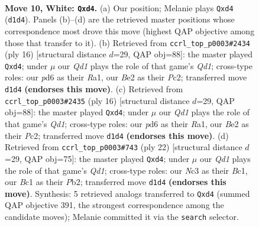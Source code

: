 \documentclass[11pt]{article}
\begin{document}
\clearpage

\begin{figure}[p]\centering
\begin{subfigure}{0.46\textwidth}\centering
\resizebox{\linewidth}{!}{%
\newchessgame
\chessboard[
  setfen={r1bq1rk1/ppp2pbp/3p1np1/8/2PnP3/2N4P/PP2BPP1/R1BQ1RK1 w - - 0 10},
  showmover=false,
  pgfstyle=straightmove, color=movearrow, markmove={d1-d4}
]}
\caption{}
\end{subfigure}\hfill
\begin{subfigure}{0.46\textwidth}\centering
\resizebox{\linewidth}{!}{%
\newchessgame
\chessboard[
  setfen={r1bq1rk1/ppp1bppp/3p1n2/8/3nPP2/2N5/PPP1B1PP/R1BQ1RK1 w - - 0 9},
  showmover=false,
  pgfstyle=straightmove, color=movearrow, markmove={d1-d4}
]}
\caption{}
\end{subfigure}
\\[4pt]
\begin{subfigure}{0.46\textwidth}\centering
\resizebox{\linewidth}{!}{%
\newchessgame
\chessboard[
  setfen={r1bq1rk1/ppp1bppp/3p1n2/8/3nPP2/2N5/PPP1B1PP/R1BQ1RK1 w - - 0 9},
  showmover=false,
  pgfstyle=straightmove, color=movearrow, markmove={d1-d4}
]}
\caption{}
\end{subfigure}\hfill
\begin{subfigure}{0.46\textwidth}\centering
\resizebox{\linewidth}{!}{%
\newchessgame
\chessboard[
  setfen={r1bq1rk1/ppp3bp/3p1pp1/8/2PnP1n1/2N5/PP2BPPP/R1BQ1RK1 w - - 0 12},
  showmover=false,
  pgfstyle=straightmove, color=movearrow, markmove={d1-d4}
]}
\caption{}
\end{subfigure}
\caption{\textbf{Move 10, White: \texttt{Qxd4}.} (a) Our position; Melanie plays \texttt{Qxd4} (\texttt{d1d4}). Panels (b)--(d) are the retrieved master positions whose correspondence most drove this move (highest QAP objective among those that transfer to it). (b) Retrieved from \texttt{ccrl\_top\_p0003\#2434} (ply 16) [structural distance $d$=29, QAP obj=88]: the master played \texttt{Qxd4}; under $\mu$ our \emph{Qd1} plays the role of that game's \emph{Qd1}; cross-type roles: our \emph{p}d6 as their \emph{R}a1, our \emph{B}e2 as their \emph{P}c2; transferred move \texttt{d1d4} \textbf{(endorses this move)}. (c) Retrieved from \texttt{ccrl\_top\_p0003\#2435} (ply 16) [structural distance $d$=29, QAP obj=88]: the master played \texttt{Qxd4}; under $\mu$ our \emph{Qd1} plays the role of that game's \emph{Qd1}; cross-type roles: our \emph{p}d6 as their \emph{R}a1, our \emph{B}e2 as their \emph{P}c2; transferred move \texttt{d1d4} \textbf{(endorses this move)}. (d) Retrieved from \texttt{ccrl\_top\_p0003\#743} (ply 22) [structural distance $d$=29, QAP obj=75]: the master played \texttt{Qxd4}; under $\mu$ our \emph{Qd1} plays the role of that game's \emph{Qd1}; cross-type roles: our \emph{N}c3 as their \emph{B}c1, our \emph{B}c1 as their \emph{P}b2; transferred move \texttt{d1d4} \textbf{(endorses this move)}. Synthesis: 5 retrieved analogs transferred to \texttt{Qxd4} (summed QAP objective 391, the strongest correspondence among the candidate moves); Melanie committed it via the \texttt{search} selector.}
\label{fig:thought-m18}
\end{figure}
\end{document}
